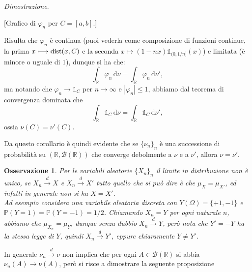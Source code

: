 \documentclass[11pt]{book}
\makeatletter
\theoremstyle{Definizione}
\theoremstyle{TeoremaProposizioneLemmaCorollario}
\theoremstyle{OsservazioneNota}
\newtheorem{myobs}{Osservazione}[section]
\renewenvironment{proof}[1][\proofname]{\par
  \normalfont \topsep6\p@\@plus6\p@\relax
  \trivlist
  \item[\hskip\labelsep
        \itshape
    #1\@addpunct{.}]\ignorespaces
}{%
  \endtrivlist\@endpefalse
}
\newcommand{\R}{\mathbb{R}}
\renewcommand{\P}{\mathbb{P}}
\renewcommand{\d}{\mathrm{d}}
\newcommand{\uno}[1]{\mathds{1}_{#1}}
\newcommand{\tod}{\overset{d}{\to}}
\renewenvironment{proof}{\textsl{Dimostrazione}.}{}
\makeatother
\begin{document}
\begin{boxoss}
\begin{proof}
\begin{center}
\end{center}
\begin{center}
[Grafico di $\varphi_n$ per $C = [a,b]$.]
\end{center} 
Risulta che $\varphi_n$ è continua (puoi vederla come composizione di funzioni continue, la prima $x \longmapsto \textup{dist}(x,C)$ e la seconda $x \longmapsto (1-nx)\uno{(0,1/n]}(x)$) e limitata (è minore o uguale di $1$), dunque si ha che:
$$
\int_\R \varphi_n \,\d\nu = \int_\R \varphi_n \, \d \nu',
$$
ma notando che $\varphi_n \to \uno{C}$ per $n\to\infty$ e $|\varphi_n| \leq 1$, abbiamo dal teorema di convergenza dominata che
$$
\int_\R \uno{C} \, \d \nu = \int_\R \uno{C} \, \d \nu',
$$
ossia $\nu(C) = \nu'(C)$.
\end{proof}
\end{boxoss}
\noindent
Da questo corollario è quindi evidente che se $\{\nu_n\}_n$ è una successione di probabilità su $(\R,\mathcal{B}(\R))$ che converge debolmente a $\nu$ e a $\nu'$, allora $\nu = \nu'$.\\
\begin{myobs}
Per le variabili aleatorie $\{X_n\}_n$ il limite in distribuzione non è unico, se $X_n \tod X$ e $X_n \tod X'$ tutto quello che si può dire è che $\mu_X = \mu_{X'}$, ed infatti in generale non si ha $X = X'$.\\
Ad esempio considera una variabile aleatoria discreta con $Y(\Omega) = \{+1,-1\}$ e $\P(Y = 1) = \P( Y = -1) = 1/2$. Chiamando $X_n = Y$ per ogni naturale $n$, abbiamo che $\mu_{X_n} = \mu_Y$, dunque senza dubbio $X_n \tod Y$, però nota che $Y' = -Y$ ha la stessa legge di $Y$, quindi $X_n \tod Y'$, eppure chiaramente $Y \neq Y'$.
\end{myobs}
In generale $\nu_n\tod \nu$ non implica che per ogni $A\in \mathcal{B}(\R)$ si abbia $\nu_n(A) \to \nu(A)$, però si risce a dimostrare la seguente proposizione
\end{document}
